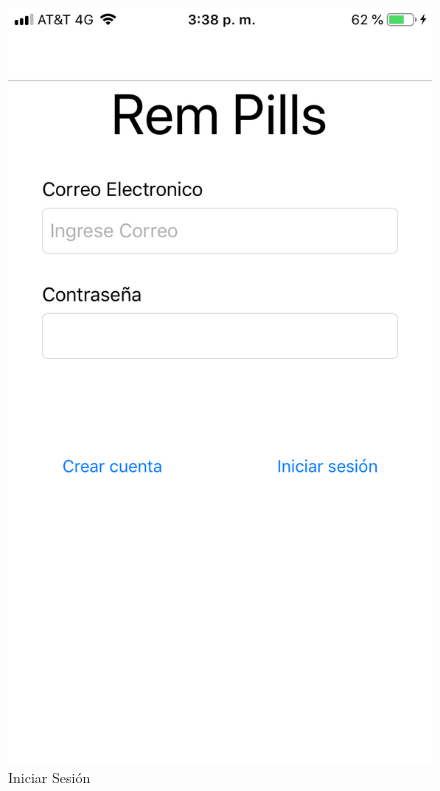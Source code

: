 \begin{enumerate}
	\begin{figure}[!htbp]			\hypertarget{fig:IniciarSesion}{\hspace{1pt}}
		\begin{center}
			\includegraphics[height=0.4\textheight]{Paciente/RegistrodeCuenta/images/IMG-3180}
			\caption{Iniciar Sesión}
			\label{fig:IniciarSesion}
		\end{center}
	\end{figure}


\end{enumerate}
